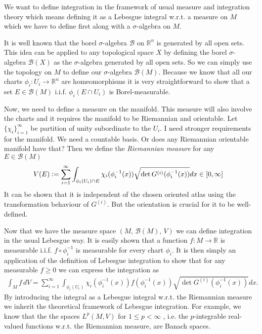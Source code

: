 \documentclass[12pt,a4paper]{article}
\numberwithin{equation}{subsection}
\numberwithin{lemma}{subsection}
\theoremstyle{definition}
\newcommand{\real}{\mathbb{R}}
\begin{document}
We want to define integration in the framework of usual measure and integration
theory which means defining it as a Lebesgue integral w.r.t. a measure on $M$
which we have to define first along with a $\sigma$-algebra on $M$. 

It is well known that
the borel $\sigma$-algebra $\mathcal{B}$ on $\real^n$ is generated
by all open sets. This idea can be applied to any topological space $X$ by 
defining the borel $\sigma$-algebra $\mathcal{B}(X)$ as the $\sigma$-algebra 
generated by all open sets. So we can simply use the topology on $M$ to define 
our $\sigma$-algebra $\mathcal{B}(M)$. Because we know that all our 
charts $\phi_i: U_i \rightarrow \real^n$ are homeomorphisms it is very 
straightforward to show that a set $E \in \mathcal{B}(M)$ i.i.f.
$\phi_i(E \cap U_i)$ is Borel-measurable. 

Now, we need to define a measure on the manifold. This measure will 
also involve the charts and it requires the manifold to be Riemannian 
and orientable. Let $\{ \chi_i \}_{i=1}^\infty$ be partition of unity 
subordinate to the $U_i$. {\color{red} I need stronger 
requirements for the manifold. We need a countable basis. Or does any 
Riemannian orientable manifold have that?}  Then we define the 
\textit{Riemannian measure} for any $E \in \mathcal{B}(M)$
\begin{align*}
    V(E) \vcentcolon= \sum\limits_{i=1}^\infty \int_{\phi_i(U_i) \cap E}
        \chi_i(\phi_i^{-1}(x)) \sqrt{\det G^{(i)}(\phi_i^{-1}(x))} dx 
        \in [0,\infty]
\end{align*}
It can be shown that it is independent of the chosen oriented atlas 
using the transformation behaviour of $G^{(i)}$. But the orientation is 
crucial for it to be well-defined. 

Now that we have the measure space $(M, \, \mathcal{B}(M), \, V)$
we can define integration in the usual Lebesgue way.
It is easily shown that a function $f: M \rightarrow \real$ is measurable 
i.i.f. $f \circ \phi_i^{-1}$ is measurable for every chart $\phi_i$. 
It is then simply an application of the definition of Lebesgue integration to
show that for any measurable $f \geq 0$ we can express the integration as
\begin{align*}
    \int_M f \, dV = \sum\limits_{i=1}^\infty \int_{\phi_i(U_i)} 
        \chi_i(\phi_i^{-1}(x)) f(\phi_i^{-1}(x)) 
        \sqrt{\det G^{(i)}(\phi_i^{-1}(x))} dx.
\end{align*}
By introducing the integral as a Lebesgue integral w.r.t. the Riemannian 
measure we inherit the theoretical framework of Lebesgue integration. 
For example, we know that the the spaces $L^p(M,V)$ for $1\leq p < \infty$
, i.e. the $p$-integrable 
real-valued functions w.r.t. the Riemannian measure, are Banach spaces.
\end{document}
